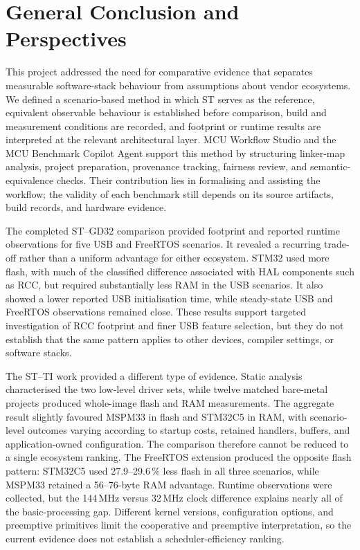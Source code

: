 \chapter*{General Conclusion and Perspectives}
{} %
\label{chap:general-conclusion}

This project addressed the need for comparative evidence that separates measurable
software-stack behaviour from assumptions about vendor ecosystems. We defined a
scenario-based method in which ST serves as the reference, equivalent observable behaviour
is established before comparison, build and measurement conditions are recorded, and
footprint or runtime results are interpreted at the relevant architectural layer. MCU
Workflow Studio and the MCU Benchmark Copilot Agent support this method by structuring
linker-map analysis, project preparation, provenance tracking, fairness review, and
semantic-equivalence checks. Their contribution lies in formalising and assisting the
workflow; the validity of each benchmark still depends on its source artifacts, build
records, and hardware evidence.

The completed ST--GD32 comparison provided footprint and reported runtime observations for
five USB and FreeRTOS scenarios. It revealed a recurring trade-off rather than a uniform
advantage for either ecosystem. STM32 used more flash, with much of the classified
difference associated with HAL components such as RCC, but required substantially less RAM
in the USB scenarios. It also showed a lower reported USB initialisation time, while
steady-state USB and FreeRTOS observations remained close. These results support targeted
investigation of RCC footprint and finer USB feature selection, but they do not establish
that the same pattern applies to other devices, compiler settings, or software stacks.

The ST--TI work provided a different type of evidence. Static analysis characterised the
two low-level driver sets, while twelve matched bare-metal projects produced whole-image
flash and RAM measurements. The aggregate result slightly favoured MSPM33 in flash and
STM32C5 in RAM, with scenario-level outcomes varying according to startup costs, retained
handlers, buffers, and application-owned configuration. The comparison therefore cannot be
reduced to a single ecosystem ranking. The FreeRTOS extension produced the opposite flash
pattern: STM32C5 used 27.9--29.6\,\% less flash in all three scenarios, while MSPM33 retained
a 56--76-byte RAM advantage. Runtime observations were collected, but the 144\,MHz versus
32\,MHz clock difference explains nearly all of the basic-processing gap. Different kernel
versions, configuration options, and preemptive primitives limit the cooperative and
preemptive interpretation, so the current evidence does not establish a scheduler-efficiency
ranking.

